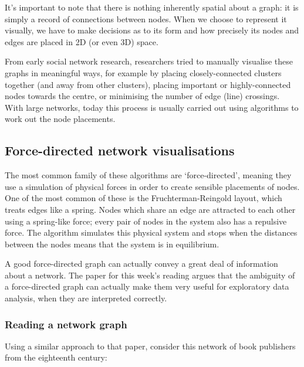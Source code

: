 \documentclass[
]{book}
\begin{document}
It's important to note that there is nothing inherently spatial about a graph: it is simply a record of connections between nodes. When we choose to represent it visually, we have to make decisions as to its form and how precisely its nodes and edges are placed in 2D (or even 3D) space.

From early social network research, researchers tried to manually visualise these graphs in meaningful ways, for example by placing closely-connected clusters together (and away from other clusters), placing important or highly-connected nodes towards the centre, or minimising the number of edge (line) crossings. With large networks, today this process is usually carried out using algorithms to work out the node placements.

\hypertarget{force-directed-network-visualisations}{%
\subsection{Force-directed network visualisations}\label{force-directed-network-visualisations}}

The most common family of these algorithms are `force-directed', meaning they use a simulation of physical forces in order to create sensible placements of nodes. One of the most common of these is the Fruchterman-Reingold layout, which treats edges like a spring. Nodes which share an edge are attracted to each other using a spring-like force; every pair of nodes in the system also has a repulsive force. The algorithm simulates this physical system and stops when the distances between the nodes means that the system is in equilibrium.

A good force-directed graph can actually convey a great deal of information about a network. The paper for this week's reading argues that the ambiguity of a force-directed graph can actually make them very useful for exploratory data analysis, when they are interpreted correctly.

\hypertarget{reading-a-network-graph}{%
\subsubsection{Reading a network graph}\label{reading-a-network-graph}}

Using a similar approach to that paper, consider this network of book publishers from the eighteenth century:
\end{document}
